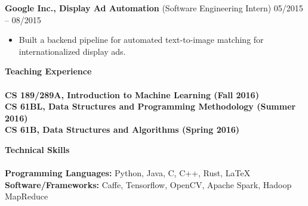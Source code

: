 \documentclass{article}
\begin{document}
\noindent
\textbf{Google Inc., Display Ad Automation} (Software Engineering Intern)
\hfill 05/2015 -- 08/2015\\
\begin{itemize}
\vspace{-6.5mm}
\item Built a backend pipeline for automated text-to-image matching for internationalized display ads.
\end{itemize}
\vspace{1mm}

\noindent
\textbf{{\Large Teaching Experience}}\\[-2mm]
\HRule\\
\hspace*{1.2mm}\textbf{CS 189/289A, Introduction to Machine Learning (Fall 2016)} \\
\vspace{0.5mm}
\textbf{CS 61BL, Data Structures and Programming Methodology (Summer 2016)} \\
\vspace{0.5mm}
\textbf{CS 61B, Data Structures and Algorithms (Spring 2016)}
\vspace{2.0mm}

\noindent
\textbf{\Large Technical Skills}\\[-2mm]
\HRule\\
\textbf{Programming Languages:} Python, Java, C, C++, Rust, \LaTeX \\
\textbf{Software/Frameworks:} Caffe, Tensorflow, OpenCV, Apache Spark, Hadoop MapReduce


\end{document}
